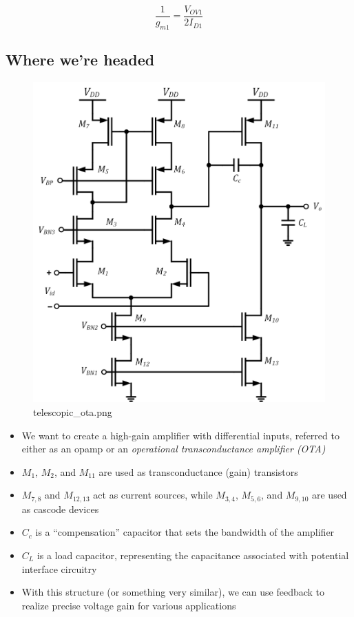 \documentclass[11pt]{article}
\begin{document}
\begin{equation}
\dfrac{1}{g_{m1}} = \dfrac{V_{OV1}}{2I_{D1}}
\end{equation}

    \hypertarget{where-were-headed}{%
\subsection{Where we're headed}\label{where-were-headed}}

    \begin{figure}
\centering
\includegraphics{telescopic_ota.png}
\caption{telescopic\_ota.png}
\end{figure}

    \begin{itemize}
\item
  We want to create a high-gain amplifier with differential inputs,
  referred to either as an opamp or an \emph{operational
  transconductance amplifier (OTA)}
\item
  \(M_1\), \(M_2\), and \(M_{11}\) are used as transconductance (gain)
  transistors
\item
  \(M_{7,8}\) and \(M_{12,13}\) act as current sources, while
  \(M_{3,4}\), \(M_{5,6}\), and \(M_{9,10}\) are used as cascode devices
\item
  \(C_c\) is a ``compensation'' capacitor that sets the bandwidth of the
  amplifier
\item
  \(C_L\) is a load capacitor, representing the capacitance associated
  with potential interface circuitry
\item
  With this structure (or something very similar), we can use feedback
  to realize precise voltage gain for various applications
\end{itemize}
\end{document}
